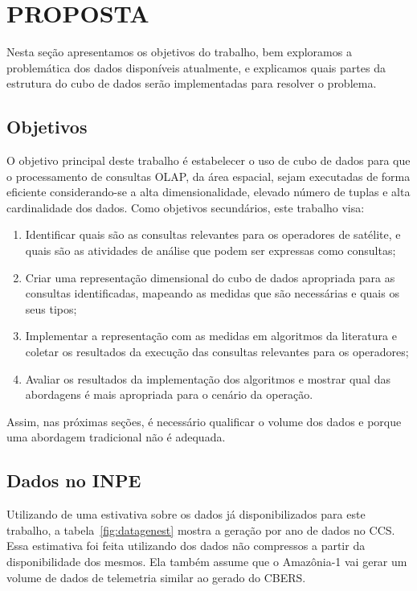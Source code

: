 
\chapter{PROPOSTA}\label{ch:prop}

Nesta seção apresentamos os objetivos do trabalho, bem exploramos a problemática dos dados disponíveis atualmente, e explicamos quais partes da estrutura do cubo de dados serão implementadas para resolver o problema.

\section{Objetivos}\label{ch:prop:obj}

O objetivo principal deste trabalho é estabelecer o uso de cubo de dados para que o processamento de consultas OLAP, da área espacial, sejam executadas de forma eficiente considerando-se a alta dimensionalidade, elevado número de tuplas e alta cardinalidade dos dados.
Como objetivos secundários, este trabalho visa:

\begin{enumerate}
\item Identificar quais são as consultas relevantes para os operadores de satélite, e quais são as atividades de análise que podem ser expressas como consultas;
\item Criar uma representação dimensional do cubo de dados apropriada para as consultas identificadas, mapeando as medidas que são necessárias e quais os seus tipos;
\item Implementar a representação com as medidas em algoritmos da literatura e coletar os resultados da execução das consultas relevantes para os operadores;
\item Avaliar os resultados da implementação dos algoritmos e mostrar qual das abordagens é mais apropriada para o cenário da operação.
\end{enumerate}

Assim, nas próximas seções, é necessário qualificar o volume dos dados e porque uma abordagem tradicional não é adequada.

\section{Dados no INPE}\label{ch:prop:data}

Utilizando de uma estivativa sobre os dados já disponibilizados para este trabalho, a tabela~\ref{fig:datagenest} mostra a geração por ano de dados no CCS.
Essa estimativa foi feita utilizando dos dados não compressos a partir da disponibilidade dos mesmos.
Ela também assume que o Amazônia-1 vai gerar um volume de dados de telemetria similar ao gerado do CBERS.

